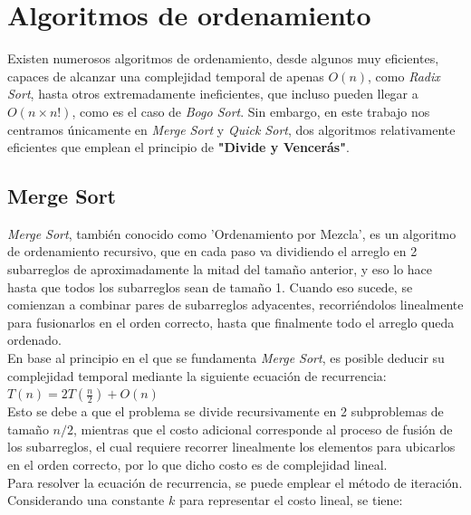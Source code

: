 \section{Algoritmos de ordenamiento}

Existen numerosos algoritmos de ordenamiento, desde algunos muy eficientes, capaces de alcanzar una complejidad temporal de apenas $O(n)$, 
como \textit{Radix Sort}, hasta otros extremadamente ineficientes, que incluso pueden llegar a $O(n \times n!)$, como es el caso de 
\textit{Bogo Sort}. Sin embargo, en este trabajo nos centramos únicamente en \textit{Merge Sort} y \textit{Quick Sort}, dos algoritmos relativamente
eficientes que emplean el principio de \textbf{"Divide y Vencerás"}. \\

\subsection{Merge Sort}

\textit{Merge Sort}, también conocido como 'Ordenamiento por Mezcla', es un algoritmo de ordenamiento recursivo, que en cada paso va dividiendo el 
arreglo en 2 subarreglos de aproximadamente la mitad del tamaño anterior, y eso lo hace hasta que todos los subarreglos sean de tamaño 1. Cuando eso sucede,
se comienzan a combinar pares de subarreglos adyacentes, recorriéndolos linealmente para fusionarlos en el orden correcto, hasta que finalmente todo el 
arreglo queda ordenado. \\

En base al principio en el que se fundamenta \textit{Merge Sort}, es posible deducir su complejidad temporal mediante la siguiente ecuación de recurrencia: \\

$T(n) = 2 T(\frac{n}{2}) + O(n)$ \\

Esto se debe a que el problema se divide recursivamente en 2 subproblemas de tamaño $n/2$, mientras que el costo adicional corresponde al proceso de 
fusión de los subarreglos, el cual requiere recorrer linealmente los elementos para ubicarlos en el orden correcto, por lo que dicho costo es de 
complejidad lineal. \\

Para resolver la ecuación de recurrencia, se puede emplear el método de iteración. Considerando una constante $k$ para representar el costo lineal, se tiene: \\

